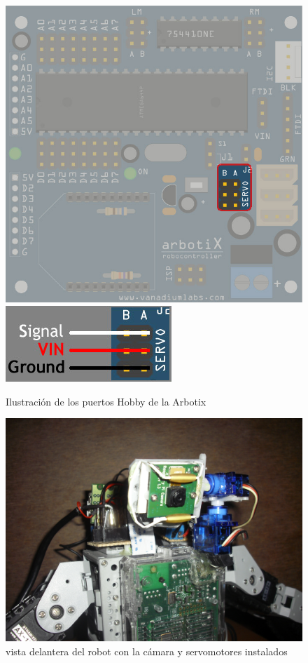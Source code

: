\begin{figure}[hbtp]
\includegraphics[scale=0.3]{imagenes/arbotix_hobby_servo.jpg}
\includegraphics[scale=0.7]{imagenes/arbotix_hobbyservos_lines.jpg}
\caption{Ilustración de los puertos Hobby de la Arbotix}
\end{figure}
 
\begin{figure}[hbtp]
\centering
\includegraphics[scale=0.1]{imagenes/servosYcamara.JPG}
\caption{vista delantera del robot con la cámara y servomotores instalados}
\end{figure}

